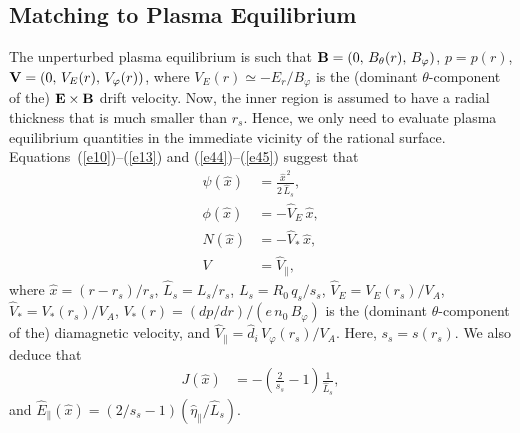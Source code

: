 \documentclass[12pt,prb,aps]{revtex4-1}
\begin{document}
\subsection{Matching to Plasma Equilibrium}
The unperturbed plasma equilibrium is such that
${\bf B} = (0,\,B_\theta(r),\,B_\varphi)$,  $p = p(r)$,
${\bf V} = (0,\,V_E(r),\,V_\varphi(r))$,
where 
$V_E(r)\simeq -E_r/B_\varphi$
 is the (dominant $\theta$-component of the) ${\bf E}\times {\bf B}$ drift velocity. Now, the inner region is assumed to have a radial thickness that is
much smaller than $r_s$.   Hence, we only need to evaluate plasma equilibrium quantities in the immediate vicinity of the rational
surface. Equations~(\ref{e10})--(\ref{e13}) and (\ref{e44})--(\ref{e45}) suggest that 
\begin{align}
\psi(\hat{x})&= \frac{\hat{x}^{\,2}}{2\,\hat{L}_s},\label{e23}\\[0.5ex]
\phi(\hat{x}) &= - \hat{V}_E\,\hat{x},\\[0.5ex]
N(\hat{x}) &= -\hat{V}_\ast\,\hat{x},\\[0.5ex]
V &= \hat{V}_\parallel,\label{e26}
\end{align}
where $\hat{x}= (r-r_s)/r_s$, 
 $\hat{L}_s=L_s/r_s$,  $L_s=R_0\,q_s/s_s$, 
  $\hat{V}_E= V_E(r_s)/V_A$,
$\hat{V}_\ast= V_\ast(r_s)/V_A$,
$V_\ast(r) = (dp/dr)/(e\,n_0\,B_\varphi)$ 
is the (dominant $\theta$-component of the) diamagnetic velocity,
  and 
 $\hat{V}_\parallel=\hat{d}_i\, V_\varphi(r_s)/V_A$. Here, $s_s=s(r_s)$. We also deduce that 
 \begin{align}\label{e28}
 J (\hat{x})&= -\left(\frac{2}{s_s}-1\right)\frac{1}{\hat{L}_s},
\end{align} 
and $ \hat{E}_\parallel(\hat{x}) =(2/s_s-1) (\hat{\eta}_\parallel/\hat{L}_s)$.
\end{document}
